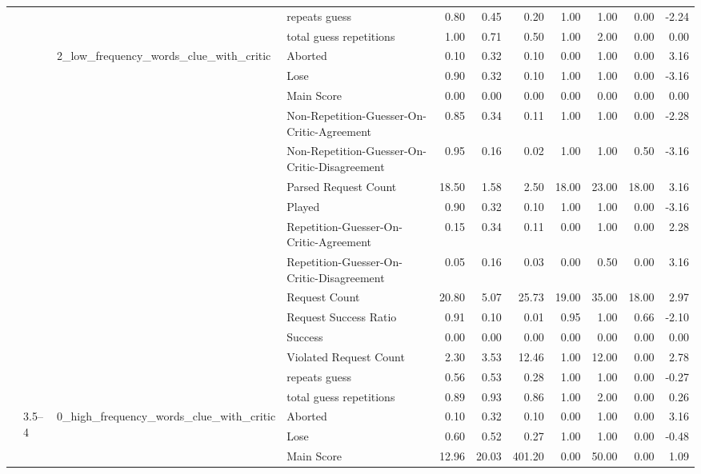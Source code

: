 \begin{tabular}{llllrrrrrrr}
 &  &  & repeats guess & 0.80 & 0.45 & 0.20 & 1.00 & 1.00 & 0.00 & -2.24 \\
 &  &  & total guess repetitions & 1.00 & 0.71 & 0.50 & 1.00 & 2.00 & 0.00 & 0.00 \\
\cline{3-11}
 &  & \multirow[t]{15}{*}{2_low_frequency_words_clue_with_critic} & Aborted & 0.10 & 0.32 & 0.10 & 0.00 & 1.00 & 0.00 & 3.16 \\
 &  &  & Lose & 0.90 & 0.32 & 0.10 & 1.00 & 1.00 & 0.00 & -3.16 \\
 &  &  & Main Score & 0.00 & 0.00 & 0.00 & 0.00 & 0.00 & 0.00 & 0.00 \\
 &  &  & Non-Repetition-Guesser-On-Critic-Agreement & 0.85 & 0.34 & 0.11 & 1.00 & 1.00 & 0.00 & -2.28 \\
 &  &  & Non-Repetition-Guesser-On-Critic-Disagreement & 0.95 & 0.16 & 0.02 & 1.00 & 1.00 & 0.50 & -3.16 \\
 &  &  & Parsed Request Count & 18.50 & 1.58 & 2.50 & 18.00 & 23.00 & 18.00 & 3.16 \\
 &  &  & Played & 0.90 & 0.32 & 0.10 & 1.00 & 1.00 & 0.00 & -3.16 \\
 &  &  & Repetition-Guesser-On-Critic-Agreement & 0.15 & 0.34 & 0.11 & 0.00 & 1.00 & 0.00 & 2.28 \\
 &  &  & Repetition-Guesser-On-Critic-Disagreement & 0.05 & 0.16 & 0.03 & 0.00 & 0.50 & 0.00 & 3.16 \\
 &  &  & Request Count & 20.80 & 5.07 & 25.73 & 19.00 & 35.00 & 18.00 & 2.97 \\
 &  &  & Request Success Ratio & 0.91 & 0.10 & 0.01 & 0.95 & 1.00 & 0.66 & -2.10 \\
 &  &  & Success & 0.00 & 0.00 & 0.00 & 0.00 & 0.00 & 0.00 & 0.00 \\
 &  &  & Violated Request Count & 2.30 & 3.53 & 12.46 & 1.00 & 12.00 & 0.00 & 2.78 \\
 &  &  & repeats guess & 0.56 & 0.53 & 0.28 & 1.00 & 1.00 & 0.00 & -0.27 \\
 &  &  & total guess repetitions & 0.89 & 0.93 & 0.86 & 1.00 & 2.00 & 0.00 & 0.26 \\
\cline{2-11} \cline{3-11}
 & \multirow[t]{45}{*}{3.5--4} & \multirow[t]{15}{*}{0_high_frequency_words_clue_with_critic} & Aborted & 0.10 & 0.32 & 0.10 & 0.00 & 1.00 & 0.00 & 3.16 \\
 &  &  & Lose & 0.60 & 0.52 & 0.27 & 1.00 & 1.00 & 0.00 & -0.48 \\
 &  &  & Main Score & 12.96 & 20.03 & 401.20 & 0.00 & 50.00 & 0.00 & 1.09 \\

\end{tabular}
